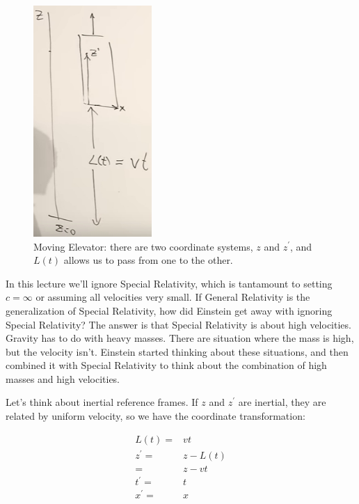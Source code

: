 \documentclass[]{article}
\begin{document}
\begin{figure}[H]
	\begin{center}
		\caption[Moving Elevator]{Moving Elevator: there are two coordinate systems, $z$ and $z^\prime$, and $L(t)$ allows us to pass from one to the other.}\label{fig:gr-1-elevator}
		\includegraphics[width=0.4\textwidth]{gr-1-elevator}
	\end{center}
\end{figure}

In this lecture we'll ignore Special Relativity, which is tantamount to setting $c=\infty$ or assuming all velocities very small. If General Relativity is the generalization of Special Relativity, how did Einstein get away with ignoring Special Relativity? The answer is that Special Relativity is about high velocities. Gravity has to do with heavy masses. There are situation where the mass is high, but the velocity isn't. Einstein started thinking about these situations, and then combined it with Special Relativity to think about the combination of high masses and high velocities.

Let's think about inertial reference frames. If $z$ and $z^\prime$ are inertial, they are related by uniform velocity, so we have the coordinate transformation:

\begin{align*}
	L(t)=&vt\\
	z^\prime =& z-L(t)\\
	=& z-vt\\
	t^\prime =& t\\
	x^\prime =& x
\end{align*}
\end{document}
